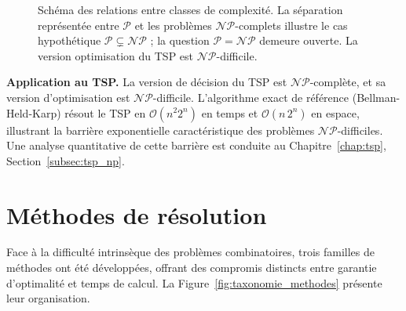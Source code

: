 \documentclass[12pt, a4paper, twoside, openright]{book}
\begin{document}
\begin{figure}[H]
		\caption{Schéma des relations entre classes de complexité. La séparation représentée entre $\mathcal{P}$ et les problèmes $\mathcal{NP}$-complets illustre le cas hypothétique $\mathcal{P}\subsetneq\mathcal{NP}$ ; la question $\mathcal{P}=\mathcal{NP}$ demeure ouverte. La version optimisation du TSP est $\mathcal{NP}$-difficile.}
		\label{fig:hierarchie_complexite}
	\end{figure}
	
	
	\textbf{Application au TSP.}
	La version de décision du TSP est $\mathcal{NP}$-complète, et sa version
	d'optimisation est $\mathcal{NP}$-difficile.	
	L'algorithme exact de référence (Bellman-Held-Karp) résout le TSP
	en $\mathcal{O}(n^2 2^n)$ en temps et $\mathcal{O}(n\,2^n)$ en espace,
	illustrant la barrière exponentielle caractéristique des problèmes
	$\mathcal{NP}$-difficiles. Une analyse quantitative de cette barrière
	est conduite au Chapitre~\ref{chap:tsp}, Section~\ref{subsec:tsp_np}.
	
	
	
	
	\section{Méthodes de résolution}
	\label{sec:methodes_res}
	
	Face à la difficulté intrinsèque des problèmes combinatoires, trois
	familles de méthodes ont été développées, offrant des compromis distincts
	entre garantie d'optimalité et temps de calcul. La
	Figure~\ref{fig:taxonomie_methodes} présente leur organisation.
	
\end{document}
